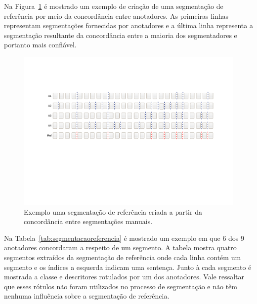 Na Figura~\ref{fig:concordanciasegref} é mostrado um exemplo de criação de uma segmentação de referência por meio da concordância entre anotadores. As primeiras linhas representam segmentações fornecidas por anotadores e a última linha representa a segmentação resultante da concordância entre a maioria dos segmentadores e portanto mais confiável. 

  \begin{center}
	\begin{figure}[h!]

	\includegraphics[trim={ 95 255 75 140 },clip,page=1,width=\textwidth]{conteudo/capitulos/figs/segmentacao-referencia.pdf}

	\caption{Exemplo uma segmentação de referência criada a partir da concordância entre segmentações manuais.}
	\label{fig:concordanciasegref}
	\end{figure}
\end{center}








Na Tabela~\ref{tab:segmentacaoreferencia} é mostrado um exemplo em que 6 dos 9 anotadores concordaram a respeito de um segmento. A tabela mostra quatro segmentos extraídos da segmentação de referência onde cada linha contém um segmento e os índices a esquerda indicam uma sentença. Junto à cada segmento é mostrada  a classe e descritores rotulados por um dos anotadores. Vale ressaltar que esses rótulos não foram utilizados no processo de segmentação e não têm nenhuma influência sobre a segmentação de referência. %


